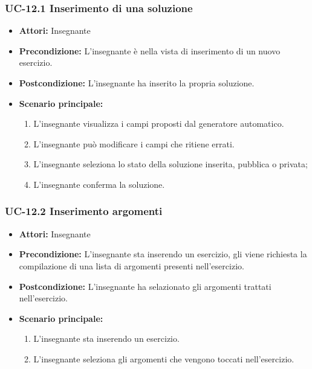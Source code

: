 \subsubsection{UC-12.1 Inserimento di una soluzione}
\begin{itemize}
\item \textbf{Attori: }Insegnante
\item \textbf{Precondizione: }L'insegnante è nella vista di inserimento di un nuovo esercizio.
\item \textbf{Postcondizione: }L'insegnante ha inserito la propria soluzione.
\item \textbf{Scenario principale: }
		\begin{enumerate} 
		\item L'insegnante visualizza i campi proposti dal generatore automatico. 
		\item L'insegnante può modificare i campi che ritiene errati.
		\item L'insegnante seleziona lo stato della soluzione inserita, pubblica o privata;
		\item L'insegnante conferma la soluzione.
		\end{enumerate}	
\end{itemize}

\subsubsection{UC-12.2 Inserimento argomenti}
\begin{itemize}
\item \textbf{Attori: }Insegnante

\item \textbf{Precondizione: }L'insegnante sta inserendo un esercizio, gli viene richiesta la compilazione di una lista di argomenti presenti nell'esercizio.
\item \textbf{Postcondizione: }L'insegnante ha selazionato gli argomenti trattati nell'esercizio.
\item \textbf{Scenario principale: }
		\begin{enumerate}
		\item L'insegnante sta inserendo un esercizio. 
		\item L'insegnante seleziona gli argomenti che vengono toccati nell'esercizio. 
		\end{enumerate}
\end{itemize}

\newpage


